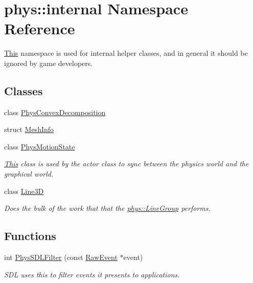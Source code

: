 \hypertarget{namespacephys_1_1internal}{
\section{phys::internal Namespace Reference}
\label{d0/d26/namespacephys_1_1internal}
}


\hyperlink{structThis}{This} namespace is used for internal helper classes, and in general it should be ignored by game developers.  


\subsection*{Classes}
\begin{DoxyCompactItemize}
\item 
class \hyperlink{classphys_1_1internal_1_1PhysConvexDecomposition}{PhysConvexDecomposition}
\item 
struct \hyperlink{structphys_1_1internal_1_1MeshInfo}{MeshInfo}
\item 
class \hyperlink{classphys_1_1internal_1_1PhysMotionState}{PhysMotionState}
\begin{DoxyCompactList}\small\item\em \hyperlink{structThis}{This} class is used by the actor class to sync between the physics world and the graphical world. \item\end{DoxyCompactList}\item 
class \hyperlink{classphys_1_1internal_1_1Line3D}{Line3D}
\begin{DoxyCompactList}\small\item\em Does the bulk of the work that that the \hyperlink{classphys_1_1LineGroup}{phys::LineGroup} performs. \item\end{DoxyCompactList}\end{DoxyCompactItemize}
\subsection*{Functions}
\begin{DoxyCompactItemize}
\item 
int \hyperlink{namespacephys_1_1internal_aae2a1133a05c67ac3062038c0c5dad4a}{PhysSDLFilter} (const \hyperlink{namespacephys_a8126d26e4507e66d09876988bb941fd4}{RawEvent} $\ast$event)
\begin{DoxyCompactList}\small\item\em SDL uses this to filter events it presents to applications. \item\end{DoxyCompactList}\end{DoxyCompactItemize}


